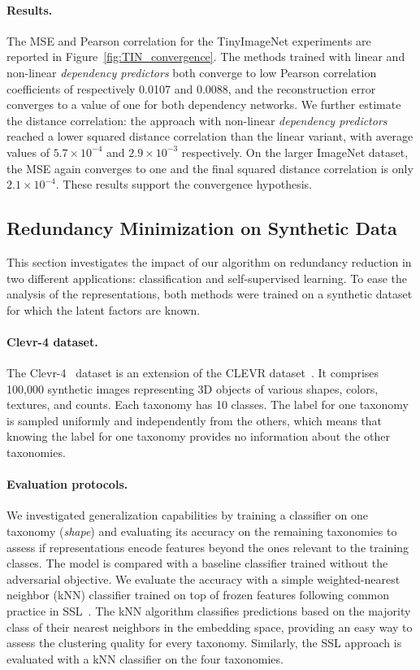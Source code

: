 \paragraph{Results.} The MSE and Pearson correlation for the TinyImageNet experiments are reported in Figure~\ref{fig:TIN_convergence}. 
The methods trained with linear and non-linear \textit{dependency predictors} both converge to low Pearson correlation coefficients of respectively 0.0107 and 0.0088, and the reconstruction error converges to a value of one for both dependency networks. 
We further estimate the distance correlation: the approach with non-linear \textit{dependency predictors} reached a lower squared distance correlation than the linear variant, with average values of $5.7 \times 10^{-4}$ and $2.9 \times 10^{-3}$ respectively. 
On the larger ImageNet dataset, the MSE again converges to one and the final squared distance correlation is only $2.1 \times 10^{-4}$. 
These results support the convergence hypothesis. 

\subsection{Redundancy Minimization on Synthetic Data} \label{sec:results_infomax}

This section investigates the impact of our algorithm on redundancy reduction in two different applications: classification and self-supervised learning. 
To ease the analysis of the representations, both methods were trained on a synthetic dataset for which the latent factors are known. 

\paragraph{Clevr-4 dataset.} The Clevr-4~\citep{vaze2024clevr4} dataset is an extension of the CLEVR dataset~\citep{johnson2017clevr}. 
It comprises 100,000 synthetic images representing 3D objects of various shapes, colors, textures, and counts. Each taxonomy has 10 classes. 
The label for one taxonomy is sampled uniformly and independently from the others, which means that knowing the label for one taxonomy provides no information about the other taxonomies. 

\paragraph{Evaluation protocols.} We investigated generalization capabilities by training a classifier on one taxonomy (\textit{shape}) and evaluating its accuracy on the remaining taxonomies to assess if representations encode features beyond the ones relevant to the training classes. The model is compared with a baseline classifier trained without the adversarial objective. 
We evaluate the accuracy with a simple weighted-nearest neighbor (kNN) classifier trained on top of frozen features following common practice in SSL~\citep{wu2018unsupervised, caron2021DINO_ssl}. 
The kNN algorithm classifies predictions based on the majority class of their nearest neighbors in the embedding space, providing an easy way to assess the clustering quality for every taxonomy. 
Similarly, the SSL approach is evaluated with a kNN classifier on the four taxonomies.

